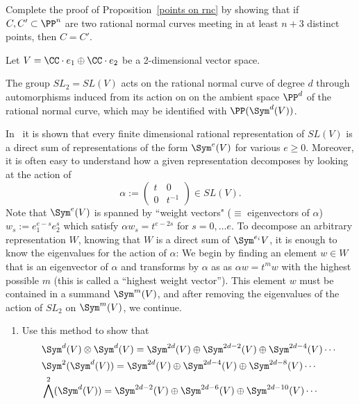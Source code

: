 \begin{exercise}\label{Castelnuovo uniqueness}
Complete the proof of Proposition~\ref{points on rnc} by showing that if $C, C' \subset \PP^n$ are two rational normal curves meeting in at least $n+3$ distinct points, then $C = C'$. 
\end{exercise}


\begin{exercise}\label{rnc and representations}
Let $V = \CC\cdot e_1\oplus \CC\cdot e_2$ be a 2-dimensional vector space. 

The group $SL_2= SL(V)$ acts on the rational normal curve of degree $d$ through automorphisms induced from its action on
 on the ambient space $\PP^d$ of the rational normal curve, which may be identified with $\PP(\Sym^d(V))$.

In~\cite[pp. 146--150]{Fulton-Harris} it is shown that
 every finite dimensional rational 
representation of $SL(V)$ is a direct sum of representations of the form $\Sym^e(V)$ for various $e\geq 0$. Moreover, it is often easy to understand
how a given representation decomposes by looking at the action of
$$
\alpha := \begin{pmatrix}
t&0\\
0&t^{-1}
\end{pmatrix}
\in SL(V).
$$
Note that $\Sym^e(V)$ is spanned by ``weight vectors" ($\equiv$ eigenvectors of $\alpha$) $w_s := e_1^{e-s} e_2^{s}$ 
which satisfy $\alpha w_s = t^{e-2s}$ for $s = 0, \dots e$.
To decompose an arbitrary representation $W$, knowing that $W$ is a direct sum of $\Sym^{e_i}V$, it is enough to know the 
eigenvalues for the action of $\alpha$: We begin by finding an element $w\in W$ that
is an eigenvector of $\alpha$ and transforms by $\alpha$ as
as $\alpha w = t^mw$ with the highest possible $m$ (this is called a ``highest weight vector''). This element $w$ must be contained
in a summand $\Sym^m(V)$, and after removing the eigenvalues of the action of $SL_2$ on $\Sym^m(V)$, we continue. 
\begin{enumerate}
 \item Use this method to show that 
\begin{align*}
&\Sym^d(V)\otimes \Sym^d(V)= \Sym^{2d}(V) \oplus  \Sym^{2d-2}(V) \oplus \Sym^{2d-4}(V) \cdots\\
 &\Sym^2(\Sym^d(V))= \Sym^{2d}(V) \oplus \Sym^{2d-4}(V)\oplus \Sym^{2d-8}(V) \cdots\\
 &\bigwedge^2(\Sym^d(V))= \Sym^{2d-2}(V) \oplus \Sym^{2d-6}(V)\oplus \Sym^{2d-10}(V) \cdots
\end{align*}

\end{enumerate}
\end{exercise}
